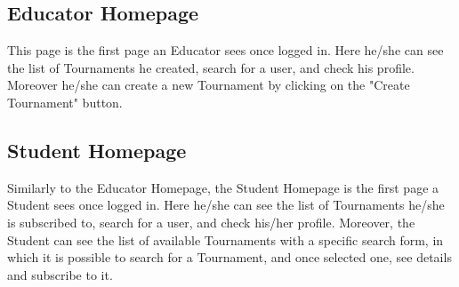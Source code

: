 \subsection{Educator Homepage}
This page is the first page an Educator sees once logged in. Here he/she can see the list of Tournaments he created, search for a user, and check his profile. Moreover he/she can create a new Tournament by clicking on the "Create Tournament" button.\\
\clearpage
\subsection{Student Homepage}
Similarly to the Educator Homepage, the Student Homepage is the first page a Student sees once logged in. Here he/she can see the list of Tournaments he/she is subscribed to, search for a user, and check his/her profile. Moreover, the Student can see the list of available Tournaments with a specific search form, in which it is possible to search for a Tournament, and once selected one, see details and subscribe to it.\\
\clearpage
